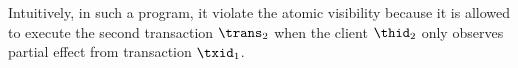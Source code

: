 






Intuitively, in such a program, it violate the atomic visibility because it is allowed to execute the second transaction \( \trans_2\) when the client $\thid_2$ only observes partial effect from transaction \( \txid_1 \).

